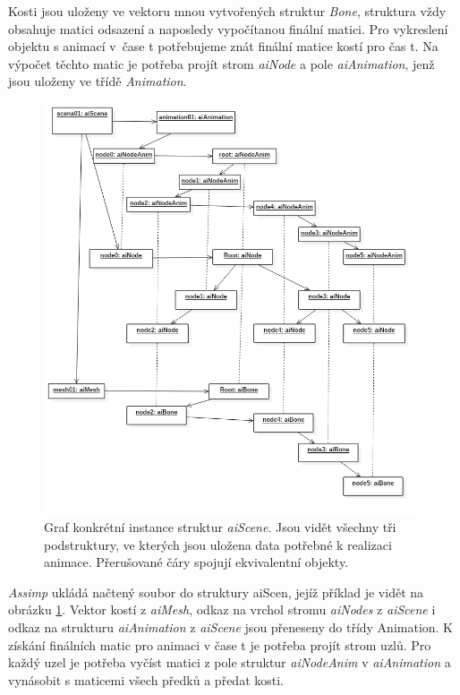 Kosti jsou uloženy ve vektoru mnou vytvořených struktur \emph{Bone}, struktura vždy obsahuje matici odsazení a naposledy vypočítanou finální matici. Pro vykreslení objektu s animací v~čase t potřebujeme znát finální matice kostí pro čas t. Na výpočet těchto matic je potřeba projít strom \emph{aiNode} a pole \emph{aiAnimation}, jenž jsou uloženy ve třídě \emph{Animation}.
    \begin{figure}
	\begin{center}
		\includegraphics[scale = 0.5]{obrazky-figures/aiATree}
		\caption{Graf konkrétní instance struktur \emph{aiScene}. Jsou vidět všechny tři podstruktury, ve kterých jsou uložena data potřebné k realizaci animace. Přerušované čáry spojují ekvivalentní objekty.}\label{aiAtree}
\end{center}\end{figure}

\emph{Assimp} ukládá načtený soubor do struktury aiScen, jejíž příklad je vidět na obrázku \ref{aiAtree}. Vektor kostí z \emph{aiMesh}, odkaz na vrchol stromu \emph{aiNodes} z \emph{aiScene} i odkaz na strukturu \emph{aiAnimation} z \emph{aiScene} jsou přeneseny do třídy Animation. K získání finálních matic pro animaci v čase t je potřeba projít strom uzlů. Pro každý uzel je potřeba vyčíst matici z pole struktur \emph{aiNodeAnim} v \emph{aiAnimation} a vynásobit s maticemi všech předků a předat kosti.
  

